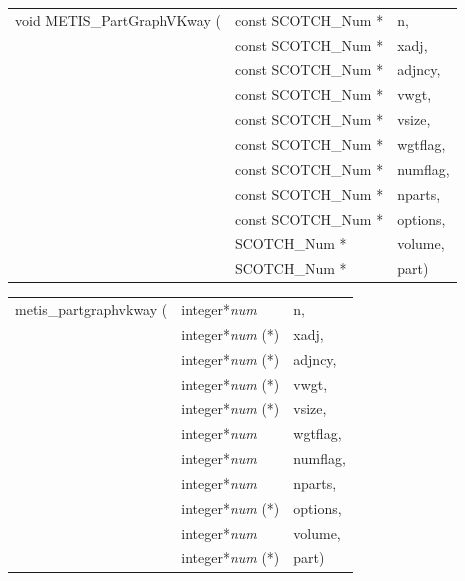 \begin{itemize}
\progsyn

{\tt\begin{tabular}{l@{}ll}
void METIS\_PartGraphVKway ( & const SCOTCH\_Num * & n,       \\
                             & const SCOTCH\_Num * & xadj,    \\
                             & const SCOTCH\_Num * & adjncy,  \\
                             & const SCOTCH\_Num * & vwgt,    \\
                             & const SCOTCH\_Num * & vsize,   \\
                             & const SCOTCH\_Num * & wgtflag, \\
                             & const SCOTCH\_Num * & numflag, \\
                             & const SCOTCH\_Num * & nparts,  \\
                             & const SCOTCH\_Num * & options, \\
                             & SCOTCH\_Num *       & volume,  \\
                             & SCOTCH\_Num *       & part)
\end{tabular}}

{\tt\begin{tabular}{l@{}ll}
metis\_partgraphvkway ( & integer*{\it num}     & n,       \\
                        & integer*{\it num} (*) & xadj,    \\
                        & integer*{\it num} (*) & adjncy,  \\
                        & integer*{\it num} (*) & vwgt,    \\
                        & integer*{\it num} (*) & vsize,   \\
                        & integer*{\it num}     & wgtflag, \\
                        & integer*{\it num}     & numflag, \\
                        & integer*{\it num}     & nparts,  \\
                        & integer*{\it num} (*) & options, \\
                        & integer*{\it num}     & volume,  \\
                        & integer*{\it num} (*) & part)
\end{tabular}}


\end{itemize}
